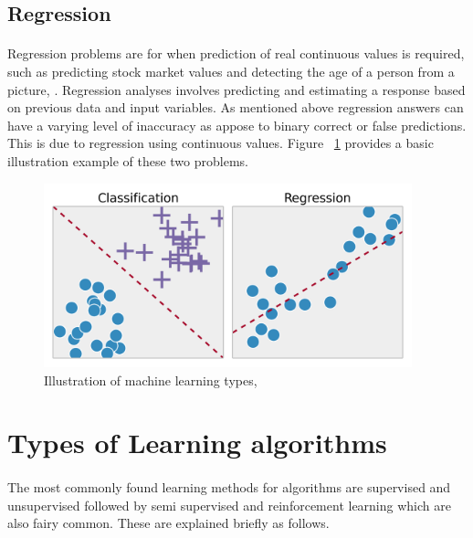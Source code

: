 \subsection{Regression} 
\label{ssec:subsection2}

\paragraph{}Regression problems are for when prediction of real continuous values is required, such as predicting stock market values and detecting the age of a person from a picture, \cite{pythonML}. Regression analyses involves predicting and estimating a response based on previous data and input variables. As mentioned above regression answers can have a varying level of inaccuracy as appose to binary correct or false predictions. This is due to regression using continuous values.
Figure ~\ref{fig:regvsclass}  provides a basic illustration example of these two problems.

\begin{figure} 
   \centering
   \includegraphics[width=0.95\textwidth]{Figures/ml.png}
   \caption[Illustration of machine learning types]{ Illustration of machine learning types, ~\cite{pythonML}}
   \label{fig:regvsclass}
\end{figure}


\section{Types of Learning algorithms}
\label{sec:section5}

\paragraph{}The most commonly found learning methods for algorithms are supervised and unsupervised followed by semi supervised and reinforcement learning which are also fairy common. These are explained briefly as follows.

